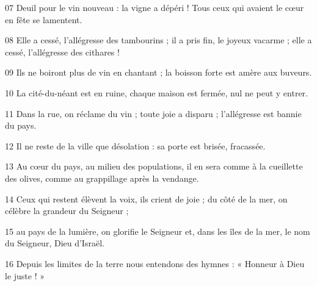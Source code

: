
07 Deuil pour le vin nouveau : la vigne a dépéri ! Tous ceux qui avaient le cœur en fête se lamentent.

08 Elle a cessé, l’allégresse des tambourins ; il a pris fin, le joyeux vacarme ; elle a cessé, l’allégresse des cithares !

09 Ils ne boiront plus de vin en chantant ; la boisson forte est amère aux buveurs.

10 La cité-du-néant est en ruine, chaque maison est fermée, nul ne peut y entrer.

11 Dans la rue, on réclame du vin ; toute joie a disparu ; l’allégresse est bannie du pays.

12 Il ne reste de la ville que désolation : sa porte est brisée, fracassée.

13 Au cœur du pays, au milieu des populations, il en sera comme à la cueillette des olives, comme au grappillage après la vendange.

14 Ceux qui restent élèvent la voix, ils crient de joie ; du côté de la mer, on célèbre la grandeur du Seigneur ;

15 au pays de la lumière, on glorifie le Seigneur et, dans les îles de la mer, le nom du Seigneur, Dieu d’Israël.

16 Depuis les limites de la terre nous entendons des hymnes : « Honneur à Dieu le juste ! »